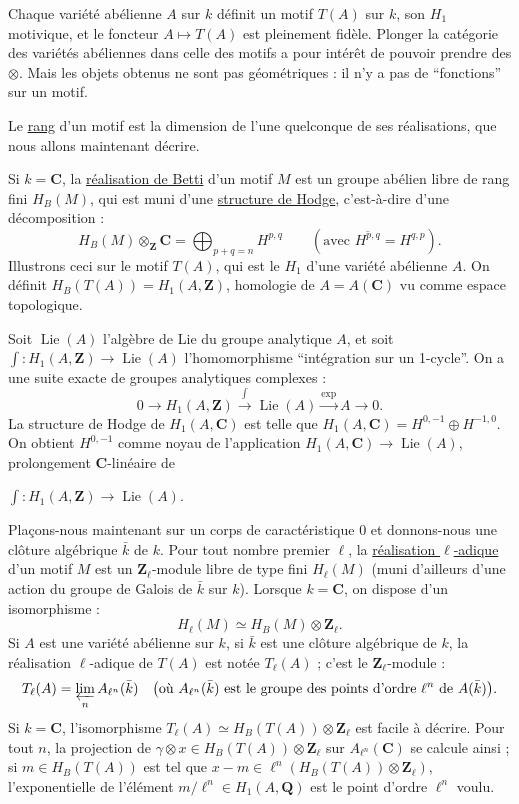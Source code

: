 \documentclass[10pt,a4paper]{article}
\newcommand{\Z}{\mathbf Z}
\newcommand{\Q}{\mathbf Q}
\newcommand{\C}{\mathbf C}
\begin{document}
Chaque variété abélienne $A$ sur $k$ définit un motif $T(A)$ sur $k$, son $H_1$ motivique, et le foncteur $A\mapsto T(A)$ est pleinement fidèle. Plonger la catégorie des variétés abéliennes dans celle des motifs a pour intérêt de pouvoir prendre des $\otimes$. Mais les objets obtenus ne sont pas géométriques : il n'y a pas de ``fonctions'' sur un motif.

Le \uline{rang} d'un motif est la dimension de l'une quelconque de ses réalisations, que nous allons maintenant décrire.

Si $k=\C$, la \uline{réalisation de Betti} d'un motif $M$ est un groupe abélien libre de rang fini $H_B(M)$, qui est muni d'une \uline{structure de Hodge}, c'est-à-dire d'une décomposition :
\[
H_B(M)\otimes_{\Z}\C=\bigoplus_{p+q=n}H^{p,q}\qquad(\text{avec }\overline{H^{p,q}}=H^{q,p}).
\]
Illustrons ceci sur le motif $T(A)$, qui est le $H_1$ d'une variété abélienne $A$. On définit $H_B(T(A))=H_1(A,\Z)$, homologie de $A=A(\C)$ vu comme espace topologique.

Soit $\operatorname{Lie}(A)$ l'algèbre de Lie du groupe analytique $A$, et soit $\int:H_1(A,\Z)\to\operatorname{Lie}(A)$ l'homomorphisme ``intégration sur un 1-cycle''. On a une suite exacte de groupes analytiques complexes :
\[
0\longrightarrow H_1(A,\Z)\xrightarrow{\int}\operatorname{Lie}(A)\xrightarrow{\exp}A\longrightarrow0.
\]
La structure de Hodge de $H_1(A,\C)$ est telle que $H_1(A,\C)=H^{0,-1}\oplus H^{-1,0}$. On obtient $H^{0,-1}$ comme noyau de l'application $H_1(A,\C)\to\operatorname{Lie}(A)$, prolongement $\C$-linéaire de


\newpage


$\int:H_1(A,\Z)\to\operatorname{Lie}(A)$.

Plaçons-nous maintenant sur un corps de caractéristique $0$ et donnons-nous une clôture algébrique $\bar k$ de $k$. Pour tout nombre premier $\ell$, la \uline{réalisation $\ell$-adique} d'un motif $M$ est un $\Z_\ell$-module libre de type fini $H_\ell(M)$ (muni d'ailleurs d'une action du groupe de Galois de $\bar k$ sur $k$). Lorsque $k=\C$, on dispose d'un isomorphisme :
\[
H_\ell(M)\simeq H_B(M)\otimes\Z_\ell.
\]
Si $A$ est une variété abélienne sur $k$, si $\bar k$ est une clôture algébrique de $k$, la réalisation $\ell$-adique de $T(A)$ est notée $T_\ell(A)$ ; c'est le $\Z_\ell$-module :
\[
T_\ell(A)=\varprojlim_n A_{\ell^n}(\bar k)
\quad\bigl(\text{où }A_{\ell^n}(\bar k)\text{ est le groupe des points d'ordre }\ell^n\text{ de }A(\bar k)\bigr).
\]
Si $k=\C$, l'isomorphisme $T_\ell(A)\simeq H_B(T(A))\otimes\Z_\ell$ est facile à décrire. Pour tout $n$, la projection de $\gamma\otimes x\in H_B(T(A))\otimes\Z_\ell$ sur $A_{\ell^n}(\C)$ se calcule ainsi ; si $m\in H_B(T(A))$ est tel que $x-m\in\ell^n(H_B(T(A))\otimes\Z_\ell)$, l'exponentielle de l'élément $m/\ell^n\in H_1(A,\Q)$ est le point d'ordre $\ell^n$ voulu.
\end{document}
